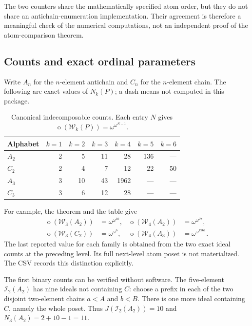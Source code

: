 \documentclass[11pt,letterpaper]{article}
\theoremstyle{definition}
\theoremstyle{remark}
\newcommand{\W}{\mathcal W}
\newcommand{\I}{\mathcal I}
\newcommand{\otp}{\operatorname{o}}
\begin{document}
The two counters share the mathematically specified atom order, but they
do not share an antichain-enumeration implementation. Their agreement is
therefore a meaningful check of the numerical computations, not an
independent proof of the atom-comparison theorem.

\subsection{Counts and exact ordinal parameters}

Write $A_n$ for the $n$-element antichain and $C_n$ for the $n$-element chain.
The following are exact values of $N_k(P)$; a dash means not computed in
this package.

\begin{table}[ht]
\centering
\renewcommand{\arraystretch}{1.2}
\begin{tabular}{@{}lrrrrrr@{}}
\toprule
Alphabet & $k=1$ & $k=2$ & $k=3$ & $k=4$ & $k=5$ & $k=6$\\
\midrule
$A_2$ & 2 & 5 & 11 & 28 & 136 & ---\\
$C_2$ & 2 & 4 & 7 & 12 & 22 & 50\\
$A_3$ & 3 & 10 & 43 & 1962 & --- & ---\\
$C_3$ & 3 & 6 & 12 & 28 & --- & ---\\
\bottomrule
\end{tabular}
\caption{Canonical indecomposable counts. Each entry $N$ gives
$\otp(\W_k(P))=\omega^{\omega^{N-1}}$.}
\label{tab:counts}
\end{table}

For example, the theorem and the table give
\[
\begin{aligned}
  \otp(\W_3(A_2))&=\omega^{\omega^{10}}, &
  \otp(\W_4(A_2))&=\omega^{\omega^{27}},\\
  \otp(\W_3(C_2))&=\omega^{\omega^6}, &
  \otp(\W_4(A_3))&=\omega^{\omega^{1961}}.
\end{aligned}
\]
The last reported value for each family is obtained from the two exact
ideal counts at the preceding level. Its full next-level atom poset is
not materialized. The CSV records this distinction explicitly.

The first binary counts can be verified without software. The five-element
$\I_2(A_2)$ has nine ideals not containing $C$: choose a prefix in each of
the two disjoint two-element chains $a<A$ and $b<B$. There is one more
ideal containing $C$, namely the whole poset. Thus $J(\I_2(A_2))=10$
and $N_3(A_2)=2+10-1=11$.
\end{document}

